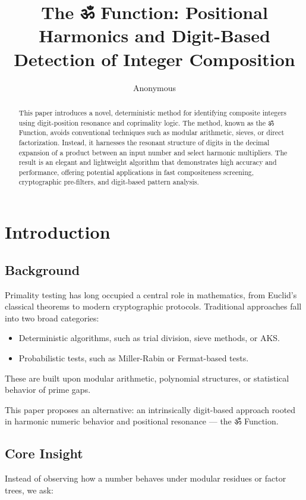 \documentclass{article}
\title{The ॐ Function: Positional Harmonics and Digit-Based Detection of Integer Composition}
\author{Anonymous}
\date{}
\begin{document}
\maketitle

\begin{abstract}
This paper introduces a novel, deterministic method for identifying composite integers using digit-position resonance and coprimality logic. The method, known as the ॐ Function, avoids conventional techniques such as modular arithmetic, sieves, or direct factorization. Instead, it harnesses the resonant structure of digits in the decimal expansion of a product between an input number and select harmonic multipliers. The result is an elegant and lightweight algorithm that demonstrates high accuracy and performance, offering potential applications in fast compositeness screening, cryptographic pre-filters, and digit-based pattern analysis.
\end{abstract}

\section{Introduction}

\subsection{Background}
Primality testing has long occupied a central role in mathematics, from Euclid’s classical theorems to modern cryptographic protocols. Traditional approaches fall into two broad categories:

\begin{itemize}
    \item Deterministic algorithms, such as trial division, sieve methods, or AKS.
    \item Probabilistic tests, such as Miller-Rabin or Fermat-based tests.
\end{itemize}

These are built upon modular arithmetic, polynomial structures, or statistical behavior of prime gaps.

This paper proposes an alternative: an intrinsically digit-based approach rooted in harmonic numeric behavior and positional resonance — the ॐ Function.

\subsection{Core Insight}
Instead of observing how a number behaves under modular residues or factor trees, we ask:
\end{document}
